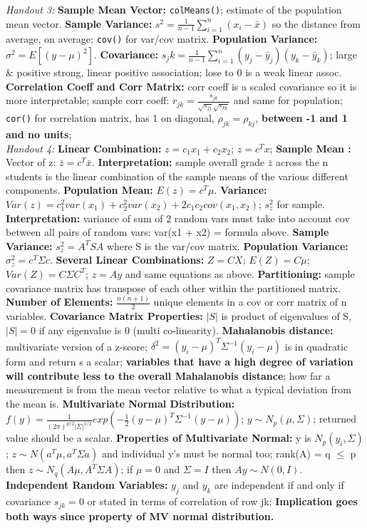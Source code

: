 \documentclass[9pt]{extarticle}
\begin{document}
\textit{Handout 3:}
\textbf{Sample Mean Vector:} \texttt{colMeans()}; estimate of the population 
mean vector.
\textbf{Sample Variance:} $s^2 = \frac{1}{n-1} \sum_{i=1}^n (x_i - \bar{x})$ so 
the distance from average, on average; \texttt{cov()} for var/cov matrix.
\textbf{Population Variance:} $\sigma^2 = E[(y - \mu)^2]$.
\textbf{Covariance:} $s_jk = \frac{1}{n-1} \sum_{i=1}^n (y_{j} - \bar{y}_j)
(y_{k} - \bar{y}_k)$; large \& positive strong, linear positive association; 
lose to 0 is a weak linear assoc.
\textbf{Correlation Coeff and Corr Matrix:} corr coeff is a scaled covariance so 
it is more interpretable; sample corr coeff: $r_{jk} = \frac{s_{jk}}{
    \sqrt{s_{jj}}\sqrt{s_{kk}}}$ and same for population; \texttt{cor()} for
correlation matrix, has 1 on diagonal, $\rho_{jk} = \rho_{kj}$, \textbf{between
-1 and 1 and no units};\\

\textit{Handout 4:}
\textbf{Linear Combination:} $z = c_1x_1 + c_2x_2$; $z = c^Tx$; 
\textbf{Sample Mean :} Vector of z: $\bar{z} = c^T\bar{x}$. 
\textbf{Interpretation:} sample overall grade $\bar{z}$ across the n students 
is the linear combination of the sample means of the various different 
components.
\textbf{Population Mean:} $E(z) = c^T\mu$.
\textbf{Variance:} $Var(z) = c_1^2var(x_1) + c_2^2var(x_2) + 2c_1c_2 
cov(x_1, x_2)$; $s_z^2$ for sample.
\textbf{Interpretation:} variance of sum of 2 random vars must take into 
account cov between all pairs of random vars: var(x1 + x2) = formula above.
\textbf{Sample Variance:} $s_z^2 = A^TSA$ where S is the var/cov matrix.
\textbf{Population Variance:} $\sigma_z^2 = c^T\Sigma c$.
\textbf{Several Linear Combinations:} $Z = CX$; $E(Z) = C\mu$; $Var(Z) =
C\Sigma C^T$; $z = Ay$ and same equations as above.
\textbf{Partitioning:} sample covariance matrix has transpose of each other 
within the partitioned matrix.
\textbf{Number of Elements:} $\frac{n(n+1)}{2}$ unique elements in a 
cov or corr matrix of n variables.
\textbf{Covariance Matrix Properties:} $|S|$ is product of eigenvalues of S, 
$|S| = 0$ if any eigenvalue is 0 (multi co-linearity).
\textbf{Mahalanobis distance:} multivariate version of a z-score;
$\delta^2 = (y_i - \mu)^T\Sigma^{-1}(y_i - \mu)$ is in quadratic form and 
return s a scalar; \textbf{variables that have a high degree of variation
will contribute less to the overall Mahalanobis distance}; how far a 
measurement is from the mean vector relative to what a typical deviation from 
the mean is.
\textbf{Multivariate Normal Distribution:} $f(y) = \frac{1}{(2\pi)^{p/2}|
\Sigma|^{1/2}}exp(-\frac{1}{2}(y - \mu)^T\Sigma^{-1}(y - \mu))$; 
$y \sim N_p(\mu, \Sigma)$; returned value should be a scalar.
\textbf{Properties of Multivariate Normal:} y is $N_p(y_i, \Sigma)$; 
$z \sim N(a^T\mu, a^T\Sigma a)$ and individual y's must be normal too; 
rank(A) = q $\leq$ p then $z \sim N_q(A\mu, A^T\Sigma A)$; if $\mu = 0$ and 
$\Sigma = I$ then $Ay \sim N(0, I)$.
\textbf{Independent Random Variables:} $y_j$ and $y_k$ are independent if
and only if covariance $s_{jk} = 0$ or stated in terms of correlation of row jk;
\textbf{Implication goes both ways since property of MV normal distribution.} \\
\end{document}

